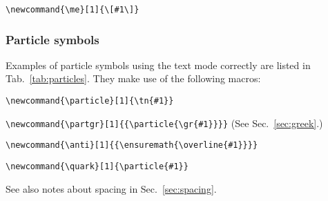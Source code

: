\documentclass[12pt,a4paper]{article}
\begin{document}
\verb_\newcommand{\me}[1]{\[#1\]}_

\subsubsection{Particle symbols}
\label{sec:particles}

Examples of particle symbols using the text mode correctly are listed in Tab.~\ref{tab:particles}.
They make use of the following macros:

\verb!\newcommand{\particle}[1]{\tn{#1}}!

\verb!\newcommand{\partgr}[1]{{\particle{\gr{#1}}}}! (See Sec.~\ref{sec:greek}.)

\verb!\newcommand{\anti}[1]{{\ensuremath{\overline{#1}}}}!

\verb!\newcommand{\quark}[1]{\particle{#1}}!

See also notes about spacing in Sec.~\ref{sec:spacing}.
\end{document}
